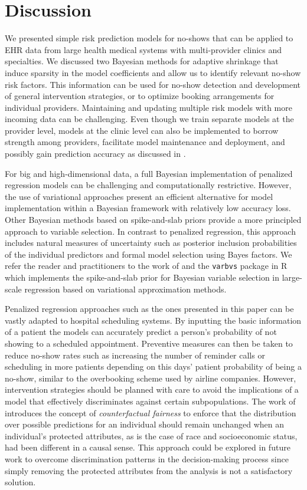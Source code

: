 \documentclass[twoside,11pt]{article}
\begin{document}
\section{Discussion} 

We presented simple risk prediction models for no-shows that can be applied to EHR data from large health medical systems with multi-provider clinics and specialties. We discussed two Bayesian methods for adaptive shrinkage that induce sparsity in the model coefficients and allow us to identify relevant no-show risk factors. This information can be used for no-show detection and development of general intervention strategies, or to optimize booking arrangements for individual providers. Maintaining and updating multiple risk models with more incoming data can be challenging. Even though we train separate models at the provider level, models at the clinic level can also be implemented to borrow strength among providers, facilitate model maintenance and deployment, and possibly gain prediction accuracy as discussed in \cite{Ben18}.  

For big and high-dimensional data, a full Bayesian implementation of penalized regression models can be challenging and computationally restrictive. However, the use of variational approaches present an efficient alternative for model implementation within a Bayesian framework with relatively low accuracy loss. Other Bayesian methods based on spike-and-slab priors \citep{GeorgeMcCulloch93} provide a more principled approach to variable selection. In contrast to penalized regression, this approach includes natural measures of uncertainty such as posterior inclusion probabilities of the individual predictors and formal model selection using Bayes factors. We refer the reader and practitioners to the work of \cite{carbonetto
17}  and the \texttt{varbvs} package in R which implements the spike-and-slab prior for Bayesian variable selection in large-scale regression based on variational approximation methods. 

Penalized regression approaches such as the ones presented in this paper can be vastly adapted to hospital scheduling systems. By inputting the basic information of a patient the models can accurately predict a person's probability of not showing to a scheduled appointment. Preventive measures can then be taken to reduce no-show rates such as increasing the number of reminder calls or scheduling in more patients depending on this days' patient probability of being a no-show,  similar to the overbooking scheme used by airline companies. However, intervention strategies should be planned with care to avoid the implications of a model that effectively discriminates against certain subpopulations. The work of \cite{Kusner17} introduces the concept of \emph{counterfactual fairness} to enforce that the distribution over possible predictions for an individual should remain unchanged when an individual's protected attributes, as is the case of race and socioeconomic status, had been different in a causal sense. This approach could be explored in future work to overcome discrimination patterns in the decision-making process since simply removing the protected attributes from the analysis is not a satisfactory solution.
\end{document}
